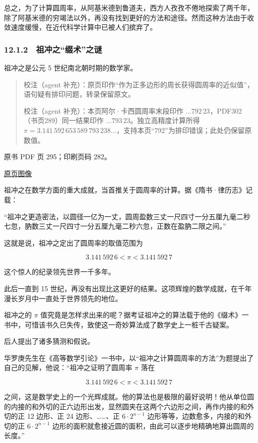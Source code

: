 总之，为了计算圆周率，从阿基米德到鲁道夫，西方人孜孜不倦地探索了两千年，除了阿基米德的穷竭法以外，再没有找到更好的方法和途径。然而这种方法由于收敛速度缓慢，在近代科学计算中已被人们摈弃了。

\subsubsection{12.1.2　祖冲之``缀术''之谜}\label{ch12-ux7956ux51b2ux4e4bux7f00ux672fux4e4bux8c1c}

祖冲之是公元 5 世纪南北朝时期的数学家。

\begin{quote}
校注（agent 补充）：原页印作``作为正多边形的周长获得圆周率的近似值''，语句疑有排印问题，转录保留原文。

校注（agent 补充）：本页阿尔·卡西圆周率末段印作 \(\ldots792\,23\)，PDF302（书页289）同一结果印作 \(\ldots793\,23\)。独立高精度计算所得 \(\pi=3.141\,592\,653\,589\,793\,238\ldots\)，支持本页``792''为排印错误；此处仍保留原数值。
\end{quote}

\clearpage

原书 PDF 页 295；印刷页码 282。

\href{source-images/pdf-295.jpeg}{原页图像}

祖冲之在数学方面的重大成就，当首推关于圆周率的计算。据《隋书·律历志》记载：

``祖冲之更造密法，以圆径一亿为一丈，圆周盈数三丈一尺四寸一分五厘九毫二秒七忽，肭数三丈一尺四寸一分五厘九毫二秒六忽，正数在盈肭二限之间。''

这就是说，祖冲之定出了圆周率的取值范围为

\[
3.141\,592\,6<\pi<3.141\,592\,7
\]

这个惊人的纪录领先世界一千多年。

此后一直到 15 世纪，再没有出现比这更好的结果。这项辉煌的数学成就，在千年漫长岁月中一直处于世界领先的地位。

祖冲之的 \(\pi\) 值究竟是怎样求出来的呢？据考证祖冲之的算法载于他的《缀术》一书中，可惜该书久已失传，致使这一奇妙算法成了数学史上一桩千古疑案。

后人提出了诸多猜测和假说。

华罗庚先生在《高等数学引论》一书中，以``祖冲之计算圆周率的方法''为题提出了自己的见解，他说：``祖冲之证明了圆周率 \(\pi\) 落在

\[
3.141\,592\,6<\pi<3.141\,592\,7
\]

之间，这是数学史上的一个光辉成就。他的算法也是极限的最好说明！他从单位圆的内接的和外切的正六边形出发，显然圆夹在这两个六边形之间，再作内接的和外切的正 12 边形、正 24 边形、\ldots\ldots、正 \(6\cdot2^{n-1}\) 边形等等，边数愈多，内接的和外切的正 \(6\cdot2^{n-1}\) 边形的面积就愈接近圆的面积，由此可以逐步地精确地算出圆周的长度。''

